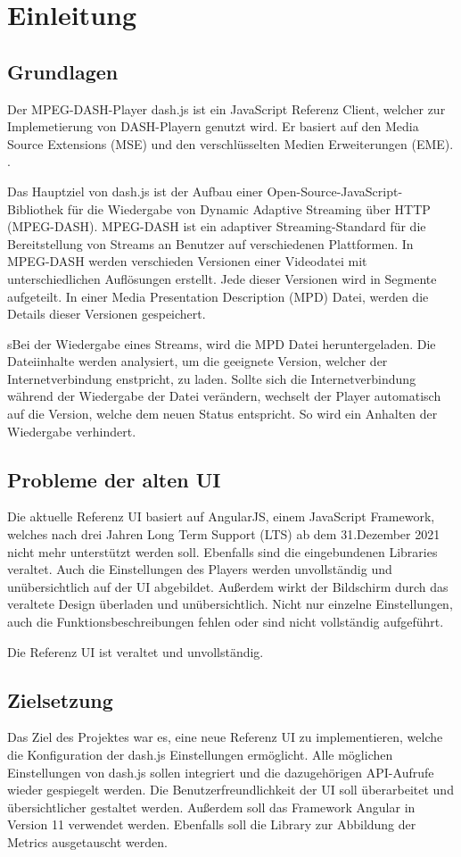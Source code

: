 \documentclass[conference]{IEEEtran}
\begin{document}
\section{Einleitung}
\subsection{Grundlagen}
Der MPEG-DASH-Player dash.js ist ein JavaScript Referenz Client, welcher zur Implemetierung von DASH-Playern genutzt wird. Er basiert auf den Media Source Extensions (MSE) und den verschlüsselten Medien Erweiterungen (EME). \cite{b1}.

Das Hauptziel von dash.js ist der Aufbau einer Open-Source-JavaScript-Bibliothek für die Wiedergabe von Dynamic Adaptive Streaming über HTTP (MPEG-DASH). MPEG-DASH ist ein adaptiver Streaming-Standard für die Bereitstellung von Streams an Benutzer auf verschiedenen Plattformen.
In MPEG-DASH werden verschieden Versionen einer Videodatei mit unterschiedlichen Auflösungen erstellt. Jede dieser Versionen wird in Segmente aufgeteilt. In einer Media Presentation Description (MPD) Datei, werden die Details dieser Versionen gespeichert.

sBei der Wiedergabe eines Streams, wird die MPD Datei heruntergeladen. Die Dateiinhalte werden analysiert, um die geeignete Version, welcher der Internetverbindung enstpricht, zu laden. Sollte sich die Internetverbindung während der Wiedergabe der Datei verändern, wechselt der Player automatisch auf die Version, welche dem neuen Status entspricht. So wird ein Anhalten der Wiedergabe verhindert. \cite{b2} 

\subsection{Probleme der alten UI}
Die aktuelle Referenz UI basiert auf AngularJS, einem JavaScript Framework, welches nach drei Jahren Long Term Support (LTS) ab dem 31.Dezember 2021 nicht mehr unterstützt werden soll. Ebenfalls sind die eingebundenen Libraries veraltet.
Auch die Einstellungen des Players werden unvollständig und unübersichtlich auf der UI abgebildet. Außerdem wirkt der Bildschirm durch das veraltete Design überladen und unübersichtlich. Nicht nur einzelne Einstellungen, auch
die Funktionsbeschreibungen fehlen oder sind nicht vollständig aufgeführt.

Die Referenz UI ist veraltet und unvollständig.

\subsection{Zielsetzung}
Das Ziel des Projektes war es, eine neue Referenz UI zu implementieren, welche die Konfiguration der dash.js Einstellungen ermöglicht.
Alle möglichen Einstellungen von dash.js sollen integriert und die dazugehörigen API-Aufrufe wieder gespiegelt werden.
Die Benutzerfreundlichkeit der UI soll überarbeitet und übersichtlicher gestaltet werden. Außerdem soll das Framework Angular in Version 11 verwendet werden.
Ebenfalls soll die Library zur Abbildung der Metrics ausgetauscht werden.
\end{document}
